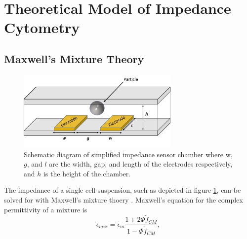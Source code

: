  
 \section[Model of Cell Suspension Impedance]{Theoretical Model of Impedance Cytometry}
 \label{sec:theory_impedance_cytometry}

\subsection{Maxwell's Mixture Theory}
\label{sec:maxwell_mixture_theory}
 \begin{figure}[ht]
 \centering
 \includegraphics[width=0.7\textwidth]{images/cellAndElectrodes.png}
 \caption[Schematic diagram of simplified impedance sensor chamber.]{Schematic diagram of simplified impedance sensor chamber where w, $g$, and $l$ are the width, gap, and length of the electrodes respectively, and $h$ is the height of the chamber.}
 \label{fig:simplified_IS}
 \end{figure}
 
  \par The impedance of a single cell suspension, such as depicted in figure \ref{fig:simplified_IS}, can be solved for with Maxwell's mixture thoery \cite{james_clerk_maxwell_treatise_1892, sun_single-cell_2010}. Maxwell's equation for the complex permittivity of a mixture is
  \begin{equation}
      \tilde{\epsilon}_{mix} = \tilde{\epsilon}_m\frac{1 + 2\Phi\tilde{f}_{CM}}{1-\Phi\tilde{f}_{CM}},
  \end{equation}
  

